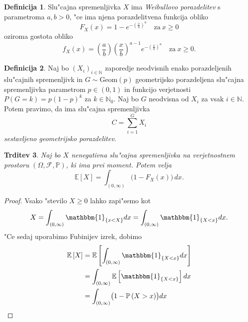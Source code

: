 \documentclass[12pt, a4paper, reqno]{amsart}
\theoremstyle{definition}
\newtheorem{definicija}{Definicija}[section]
\theoremstyle{plain}
\newtheorem{trditev}[definicija]{Trditev}
\newcommand{\N}{\mathbb{N}}
\newcommand{\E}{\mathbb{E}}
\newcommand{\Prob}{\mathbb{P}}
\newcommand{\1}{\mathds{1}}
\begin{document}
    \begin{definicija}
        Slu"cajna spremenljivka $X$ ima \textit{Weibullovo porazdelitev} s parametroma $a, b > 0$, 
        "ce ima njena porazdelitvena funkcija obliko 
        \begin{equation*}
            F_X(x) = 1 - e^{-\left(\tfrac{x}{b}\right)^a} \quad \text{za} \ x\geq 0
        \end{equation*}
        oziroma gostota obliko
        \begin{equation*}
            f_X(x) = \left(\frac{a}{b}\right)\left(\frac{x}{b}\right)^{a-1}e^{-\left(\tfrac{x}{b}\right)^a} \quad \text{za} \ x\geq 0.
        \end{equation*}
        \label{def:WeibullovaPorazdelitev}
    \end{definicija}

    \begin{definicija}
        Naj bo $(X_i)_{i\in\N}$ zaporedje neodvisnih enako porazdeljenih slu"cajnih spremenljivk in 
        $G \sim \text{Geom}(p)$ geometrijsko porazdeljena slu"cajna spremenljivka  parametrom $p\in(0, 1)$ in 
        funkcijo verjetnosti $P(G = k) = p(1 - p)^{k}$ za $k\in\N_0$.
        Naj bo $G$ neodvisna od $X_i$ za vsak $i\in\N$. Potem pravimo, da ima slu"cajna spremenljivka
        \begin{equation*}
            C = \sum_{i= 1}^{G} X_i
        \end{equation*}
        \textit{sestavljeno geometrijsko porazdelitev}.
        \label{def:CompoundGeometricDistribution}
    \end{definicija}

    \begin{trditev}
        Naj bo $X$ nenegativna slu"cajna spremenljivka na verjetnostnem prostoru $(\Omega, \mathcal{F}, \Prob)$, 
        ki ima prvi moment. Potem velja 
        \begin{equation*}
            \E\left[X\right] = \int_{(0, \infty)}\bigl(1 - F_X(x)\bigr)\,dx.
        \end{equation*}
        \label{trd:PricakovanaVrednostZPrezivetveno}
    \end{trditev}

    \begin{proof}
        Vsako "stevilo $X\geq 0$ lahko zapi"semo kot 
        \begin{equation*}
            X = \int_{(0, \infty)}\mathbbm{1}_{\{x < X\}}dx = \int_{(0, \infty)}\mathbbm{1}_{\{X < x\}}dx.
        \end{equation*}
        "Ce sedaj uporabimo Fubinijev izrek, dobimo
        \begin{align*}
            \E\left[X\right] &= \E\left[\int_{(0, \infty)}\mathbbm{1}_{\{X < x\}}dx\right] \\
                             &= \int_{(0, \infty)}\E\left[\mathbbm{1}_{\{X < x\}}\right]dx \\
                             &= \int_{(0, \infty)}\bigl(1 - \Prob\left(X > x\right)\bigr)dx \\
        \end{align*}
    \end{proof}
\end{document}
